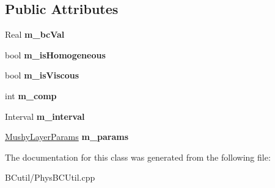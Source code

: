 \subsection*{Public Attributes}
\begin{DoxyCompactItemize}
\item 
\hypertarget{class_u_star_c_c_vel_b_c_function_a8d31075939c4445abfc8531680924acb}{Real {\bfseries m\-\_\-bc\-Val}}\label{class_u_star_c_c_vel_b_c_function_a8d31075939c4445abfc8531680924acb}

\item 
\hypertarget{class_u_star_c_c_vel_b_c_function_adb3779f05c444aa483093108a5fd55ef}{bool {\bfseries m\-\_\-is\-Homogeneous}}\label{class_u_star_c_c_vel_b_c_function_adb3779f05c444aa483093108a5fd55ef}

\item 
\hypertarget{class_u_star_c_c_vel_b_c_function_acf93092e1f15dd8119a56db56e1bcee7}{bool {\bfseries m\-\_\-is\-Viscous}}\label{class_u_star_c_c_vel_b_c_function_acf93092e1f15dd8119a56db56e1bcee7}

\item 
\hypertarget{class_u_star_c_c_vel_b_c_function_aefbf8c2d2c8fa2ad2233c19d4cf4dd43}{int {\bfseries m\-\_\-comp}}\label{class_u_star_c_c_vel_b_c_function_aefbf8c2d2c8fa2ad2233c19d4cf4dd43}

\item 
\hypertarget{class_u_star_c_c_vel_b_c_function_ad335bd9021c0f04a010cd3acd794b1ef}{Interval {\bfseries m\-\_\-interval}}\label{class_u_star_c_c_vel_b_c_function_ad335bd9021c0f04a010cd3acd794b1ef}

\item 
\hypertarget{class_u_star_c_c_vel_b_c_function_a95bf684b8804f32e526d2402ac9c7840}{\hyperlink{class_mushy_layer_params}{Mushy\-Layer\-Params} {\bfseries m\-\_\-params}}\label{class_u_star_c_c_vel_b_c_function_a95bf684b8804f32e526d2402ac9c7840}

\end{DoxyCompactItemize}


The documentation for this class was generated from the following file\-:\begin{DoxyCompactItemize}
\item 
B\-Cutil/Phys\-B\-C\-Util.\-cpp\end{DoxyCompactItemize}
